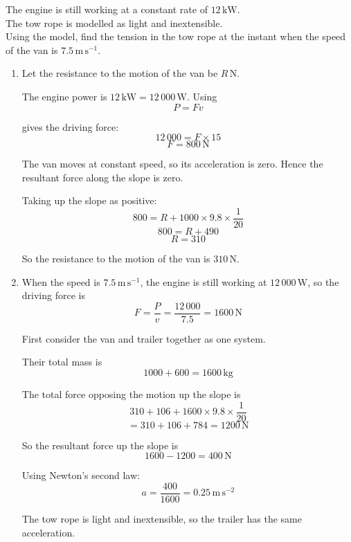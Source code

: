 \documentclass[leqno]{article}
\begin{document}
\begin{enumerate}[
  label=\textbf{\arabic*.},
  leftmargin=*,
  topsep=0pt,
  partopsep=0pt,
  parsep=0pt
]
\begin{enumerate}[label=\textbf{(\alph*)}]
  The engine is still working at a constant rate of $12\,\mathrm{kW}$. \\

  The tow rope is modelled as light and inextensible. \\

  Using the model, find the tension in the tow rope at the instant when the speed of the van is $7.5\,\mathrm{m\,s^{-1}}$.  \\
\end{enumerate}

\vspace*{10pt}

\begin{djsSolution}
\begin{enumerate}[label=\textbf{(\alph*)}, start=1]
  \item Let the resistance to the motion of the van be \(R\,\mathrm{N}\).

  The engine power is \(12\,\mathrm{kW}=12\,000\,\mathrm{W}\). Using
  \[
  P=Fv
  \]

  gives the driving force:
  \[
  12\,000=F\times 15
  \]
  \[
  F=800\,\mathrm{N}
  \]

  The van moves at constant speed, so its acceleration is zero. Hence the resultant force along the slope is zero.

  Taking up the slope as positive:
  \[
  800=R+1000\times 9.8\times \frac{1}{20}
  \]
  \[
  800=R+490
  \]
  \[
  R=310
  \]

  So the resistance to the motion of the van is \(310\,\mathrm{N}\).

  \item When the speed is \(7.5\,\mathrm{m\,s^{-1}}\), the engine is still working at \(12\,000\,\mathrm{W}\), so the driving force is
  \[
  F=\frac{P}{v}=\frac{12\,000}{7.5}=1600\,\mathrm{N}
  \]

  First consider the van and trailer together as one system.

  Their total mass is
  \[
  1000+600=1600\,\mathrm{kg}
  \]

  The total force opposing the motion up the slope is
  \[
  310+106+1600\times 9.8\times \frac{1}{20}
  \]
  \[
  =310+106+784=1200\,\mathrm{N}
  \]

  So the resultant force up the slope is
  \[
  1600-1200=400\,\mathrm{N}
  \]

  Using Newton's second law:
  \[
  a=\frac{400}{1600}=0.25\,\mathrm{m\,s^{-2}}
  \]

  The tow rope is light and inextensible, so the trailer has the same acceleration.


\end{enumerate}
\end{djsSolution}
\end{enumerate}
\end{document}
